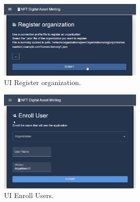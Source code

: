  \begin{figure}[!h]
        \centering
        \includegraphics[width=7cm]{img/NFT_REGISTER.png}
        \caption{UI Register organization.}
        \label{fig:UI_Register}
    \end{figure}


 \begin{figure}[!h]
        \centering
        \includegraphics[width=7cm]{img/NFT_ENROLL.png}
        \caption{UI Enroll Users.}
        \label{fig:UI_Enroll}
    \end{figure}

\hfill \break

